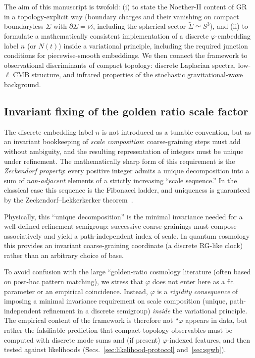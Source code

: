 \documentclass[
  reprint,
  amsmath,amssymb,
  aps,
  prd,
  superscriptaddress,
  nofootinbib,
  longbibliography
]{revtex4-2}
\newcommand{\phig}{\varphi}
\newcommand{\Sthree}{S^{3}}
\newcommand{\Sig}{\Sigma}
\theoremstyle{definition}
\theoremstyle{remark}
\begin{document}
The aim of this manuscript is twofold:
(i) to state the Noether-II content of GR in a topology-explicit way (boundary charges and their vanishing on
compact boundaryless $\Sig$ with $\partial\Sig=\varnothing$, including the spherical sector $\widetilde{\Sig}\simeq\Sthree$), and
(ii) to formulate a mathematically consistent implementation of a discrete $\phig$-embedding label $n$ (or $N(t)$)
inside a variational principle, including the required junction conditions for piecewise-smooth embeddings.
We then connect the framework to observational discriminants of compact topology: discrete Laplacian spectra,
low-$\ell$ CMB structure, and infrared properties of the stochastic gravitational-wave background.

\subsection{Invariant fixing of the golden ratio scale factor}
\label{sec:phi_invariant}
The discrete embedding label $n$ is not introduced as a tunable convention, but as an invariant bookkeeping of
\emph{scale composition}: coarse-graining steps must add without ambiguity, and the resulting representation of
integers must be unique under refinement. The mathematically sharp form of this requirement is the
\emph{Zeckendorf property}: every positive integer admits a unique decomposition into a sum of \emph{non-adjacent}
elements of a strictly increasing ``scale sequence.'' In the classical case this sequence is the Fibonacci ladder,
and uniqueness is guaranteed by the Zeckendorf--Lekkerkerker theorem~\cite{Lekkerkerker1951, Keller1972}.

Physically, this ``unique decomposition'' is the minimal invariance needed for a well-defined refinement
semigroup: successive coarse-grainings must compose associatively and yield a path-independent index of scale.
In quantum cosmology this provides an invariant coarse-graining coordinate (a discrete RG-like clock) rather than
an arbitrary choice of base.

To avoid confusion with the large ``golden-ratio cosmology literature (often based on post-hoc pattern matching),
we stress that $\phig$ does not enter here as a fit parameter or an empirical coincidence. Instead, $\phig$ is a
\emph{rigidity consequence} of imposing a minimal invariance requirement on scale composition (unique, path-independent
refinement in a discrete semigroup) \emph{inside} the variational principle. The empirical content of the framework is
therefore not ``$\phig$ appears in data, but rather the falsifiable prediction that compact-topology observables must
be computed with discrete mode sums and (if present) $\phig$-indexed features, and then tested against likelihoods
(Secs.~\ref{sec:likelihood-protocol} and~\ref{sec:sgwb}).
\end{document}
